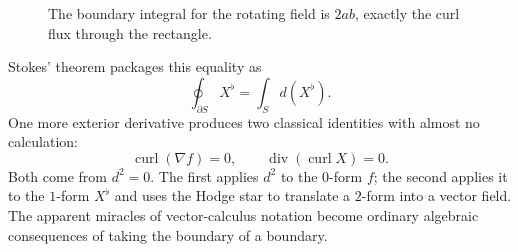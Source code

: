 \begin{figure}[H]
\centering
{}
\caption{The boundary integral for the rotating field is $2ab$, exactly the curl flux through the rectangle.}
\end{figure}

Stokes' theorem packages this equality as
\[
 \oint_{\partial S}X^\flat=\int_Sd(X^\flat).
\]
One more exterior derivative produces two classical identities with almost no calculation:
\[
 \operatorname{curl}(\nabla f)=0,\qquad
 \operatorname{div}(\operatorname{curl}X)=0.
\]
Both come from $d^2=0$. The first applies $d^2$ to the $0$-form $f$; the second applies it to the $1$-form $X^\flat$ and uses the Hodge star to translate a $2$-form into a vector field. The apparent miracles of vector-calculus notation become ordinary algebraic consequences of taking the boundary of a boundary.
